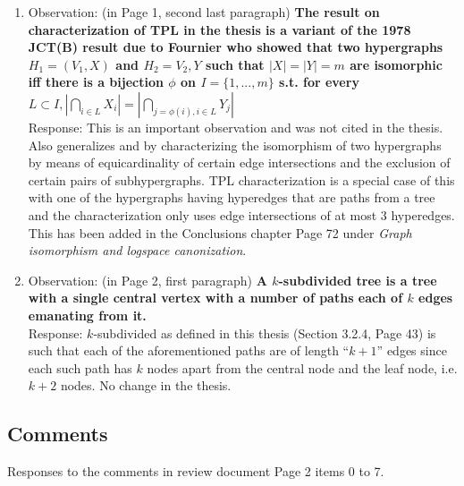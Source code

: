 \documentclass{article}
\begin{document}
\begin{enumerate}
\item Observation: (in Page 1, second last paragraph) {\bf The result on characterization of TPL in
    the thesis is a variant of the 1978 JCT(B) result due to Fournier
  who showed that two hypergraphs $H_1 = (V_1, X)$ and $H_2 = V_2, Y$
such that $|X| = |Y| = m$ are isomorphic iff there is a bijection
$\phi$ on $I = \{1, ... , m\}$ s.t. for every $L \subset I,
|\bigcap_{i \in L}X_i| = |\bigcap_{j=\phi(i),i \in L}Y_j|$} \\
Response: This is an important observation and was not cited in the thesis. Also \cite{f80}
generalizes \cite{br72} and \cite{fg65} by characterizing the
isomorphism of two hypergraphs by means of equicardinality of certain
edge intersections and the exclusion of certain pairs of
subhypergraphs. TPL characterization is a special case of this with
one of the hypergraphs having hyperedges that are paths from a tree
and the characterization only uses edge intersections of at most 3
hyperedges. This has been added in the Conclusions chapter Page 72
under {\em Graph isomorphism and logspace canonization}.

\item Observation: (in Page 2, first paragraph) {\bf A $k$-subdivided tree is
  a tree with a single central vertex with a number of paths each of
  $k$ edges emanating from it.}\\
Response: $k$-subdivided as defined in this thesis (Section
3.2.4, Page 43) is such that each
of the aforementioned paths are of length ``$k+1$'' edges since each such
path has $k$ nodes apart from the central node and the leaf node, i.e.
$k+2$ nodes. No change in the thesis.
\end{enumerate}


\subsection{Comments}
Responses to the comments in review document Page 2 items 0 to 7.
\end{document}
